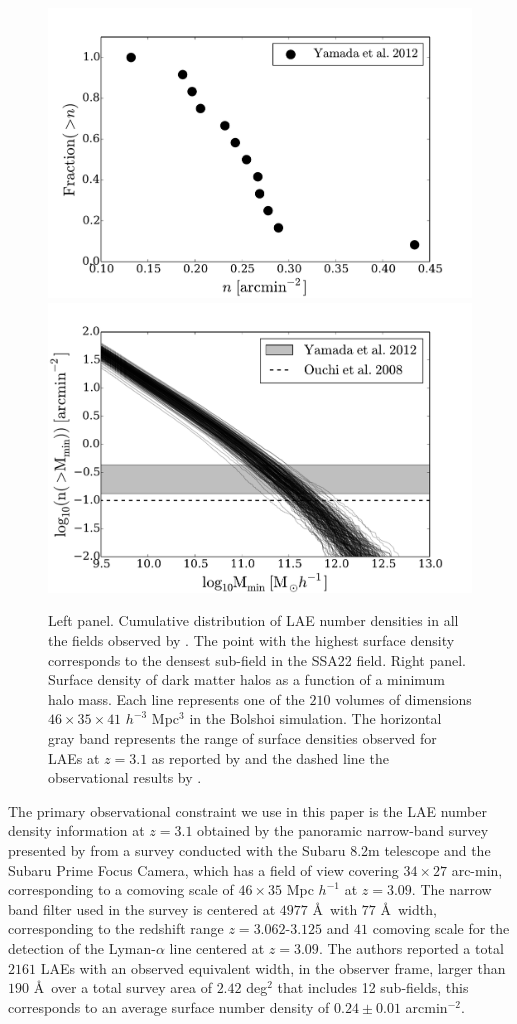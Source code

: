 \documentclass[usenatbib]{mn2e}
\newcommand{\hMpc}{{\ifmmode{h^{-1}{\rm Mpc}}\else{$h^{-1}$Mpc }\fi}}
\begin{document}
\begin{figure}
\begin{center}
\includegraphics[width=0.45\linewidth,angle=0]{Fig1b.pdf}
\includegraphics[width=0.45\linewidth,angle=0]{Fig1.pdf}
\caption{ \label{fig:halos} Left panel. Cumulative distribution of LAE number
  densities in all the fields observed by \citet{Yamada2012}. The
  point with the highest surface density corresponds to the densest
  sub-field in the SSA22 field. Right panel. Surface density of dark 
  matter halos as a function of a minimum halo mass. Each line
  represents one of the $210$ volumes of dimensions $46\times 35\times
  41$ $h^{-3}$ Mpc$^{3}$ in the Bolshoi simulation. The horizontal
  gray band represents the range of surface densities observed for
  LAEs at $z=3.1$ as reported by \citet{Yamada2012} and the dashed
  line the observational results by \citet{Ouchi2008}.}
\end{center} 
\end{figure}

The primary observational constraint we use in this paper is the LAE number
density information at $z=3.1$ obtained by the panoramic narrow-band
survey presented by \cite{Yamada2012} from a survey
conducted with the Subaru 8.2m telescope and the Subaru Prime Focus Camera,
which has a field of view covering $34\times 27$ arc-min, corresponding to a
comoving scale of $46\times35$ Mpc $h^{-1}$ at $z=3.09$.  The narrow
band filter used in the survey is centered at $4977$ \AA~with  $77$ \AA~width,
corresponding to the redshift range $z=3.062$-$3.125$ and $41$ \hMpc comoving scale for the detection of the Lyman-$\alpha$ line
centered at $z=3.09$. The authors reported a total  $2161$  LAEs with
an observed equivalent width, in the observer frame, larger than $190$
\AA~over a total survey area of $2.42$ deg$^{2}$ that includes 12
sub-fields,  this corresponds to an average surface number density of
$0.24\pm 0.01$ arcmin$^{-2}$. 
\end{document}
